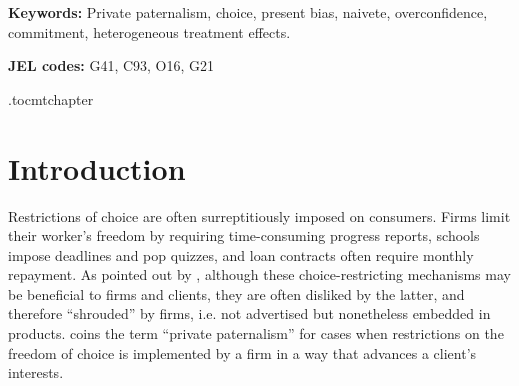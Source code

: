 \documentclass[oneside,11pt]{article}
\begin{document}
\vspace{.3in}

\textbf{Keywords: } Private paternalism, choice, present bias, naivete, overconfidence, commitment, heterogeneous treatment effects.

\textbf{JEL codes:} G41, C93, O16, G21

\newpage

\etocdepthtag.toc{mtchapter}





\section{Introduction}

Restrictions of choice are often surreptitiously imposed on consumers. Firms limit their worker's freedom by requiring time-consuming progress reports,  schools impose deadlines and pop quizzes, and loan contracts often require monthly repayment. As pointed out by \cite{Laibson2018}, although these choice-restricting mechanisms may be beneficial to firms and clients, they are often disliked by the latter, and therefore ``shrouded'' by firms, i.e. not advertised but nonetheless embedded in products. \cite{Laibson2018} coins the term ``private paternalism'' for cases when restrictions on the freedom of choice is implemented by a firm in a way that advances a client's interests. 
\end{document}
